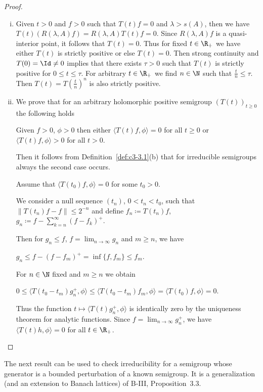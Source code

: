 \begin{proof}
\begin{enumerate}[(i), wide]
	\item
	Given $t > 0$ and $f > 0$ such that $T(t)f = 0$ and $\lambda > s(A)$, then we have $T(t)(R(\lambda,A)f) = R(\lambda,A)T(t)f = 0$.
	Since $R(\lambda,A)f$ is a quasi-interior point, it follows that $T(t) = 0$.
	Thus for fixed $t \in \R _{+}$ we have either $T(t)$ is strictly positive or else $T(t) = 0$.
	Then strong continuity and $T(0) = \Id \neq 0$ implies that there exists $\tau > 0$ such that $T(t)$ is strictly positive for $0 \leq t \leq \tau$.
	For arbitrary $t \in \R _{+}$ we find $n \in \N$ such that $\frac{t}{n} \leq \tau$.
	Then $T(t) = T(\frac{t}{n})^{n}$ is also strictly positive.
	
	\item
	We prove that for an arbitrary holomorphic positive semigroup $(T(t))_{t\geq 0}$ the following holds
	
	Given $f > 0$, $\phi > 0$ then either $\langle T(t)f,\phi \rangle = 0$ for all $t \geq 0$ or $\langle T(t)f,\phi \rangle > 0$ for all $t > 0$.
	
	Then it follows from Definition~\ref{def:c3-3.1}(b) that for irreducible semigroups always the second case occurs.
	
	Assume that $\langle T(t_{0})f,\phi \rangle = 0$ for some $t_{0} > 0$.
	
	We consider a null sequence $(t_{n})$, $0 < t_{n} < t_{0}$, such that $\|T(t_{n})f - f\| \leq 2^{-n}$ and define $f_{n} \coloneqq T(t_{n})f$, $g_{n} \coloneqq f - \sum_{k=n}^{\infty}(f-f_{k})^{+}$.
	
	Then for $g_{n} \leq f$, $f = \lim_{n\to\infty}g_{n}$ and $m \geq n$, 
	we have 
	
	$g_{n} \leq f - (f-f_{m})^{+} = \inf\{f,f_{m}\} \leq f_{m}$.
	
	For $n \in \N$ fixed and $m \geq n$ we obtain 
	
	$0 \leq \langle T(t_{0}-t_{m})g_{n}^{+},\phi \rangle \leq \langle T(t_{0}-t_{m})f_{m},\phi \rangle = \langle T(t_{0})f,\phi \rangle = 0$.
	
	Thus the function $t \mapsto \langle T(t)g_{n}^{+},\phi \rangle$ is identically zero by the uniqueness theorem for analytic functions.
	Since $f = \lim_{n\to\infty}g_{n}^{+}$, we have $\langle T(t)h,\phi \rangle = 0$ for all $t \in \R _{+}$.
\end{enumerate}
\end{proof}

The next result can be used to check irreducibility for a semigroup whose generator is a bounded perturbation of a known semigroup. It is a generalization (and an extension to Banach lattices) of B-III, Proposition~3.3. 

